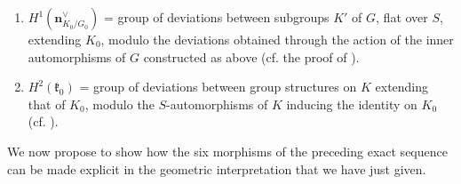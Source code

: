 \begin{enumerate}
\item[f)]
\(H^1(\mathbf n^{\vee}_{K_0/G_0})\) = group of deviations between subgroups
\(K'\) of \(G\), flat over \(S\), extending \(K_0\), modulo the deviations
obtained through the action of the inner automorphisms of \(G\)
constructed as above (cf. the proof of ).

\item[g)]
\(H^2(\mathfrak k_0)\) = group of deviations between group structures on
\(K\) extending that of \(K_0\), modulo the \(S\)-automorphisms of \(K\)
inducing the identity on \(K_0\) (cf. ).
\end{enumerate}

We now propose to show how the six morphisms of the preceding exact
sequence can be made explicit in the geometric interpretation that we
have just given.

